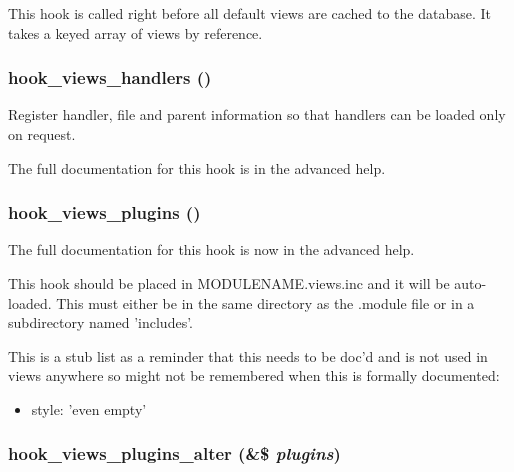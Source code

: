This hook is called right before all default views are cached to the database. It takes a keyed array of views by reference. \hypertarget{group__views__hooks_gbf506f44bd8d8a86876f27396f5341ed}{
\subsubsection[{hook\_\-views\_\-handlers}]{\setlength{\rightskip}{0pt plus 5cm}hook\_\-views\_\-handlers ()}}
\label{group__views__hooks_gbf506f44bd8d8a86876f27396f5341ed}


Register handler, file and parent information so that handlers can be loaded only on request.

The full documentation for this hook is in the advanced help. \hypertarget{group__views__hooks_g23f6e9972b2ed84fc54b7ff63f44477d}{
\subsubsection[{hook\_\-views\_\-plugins}]{\setlength{\rightskip}{0pt plus 5cm}hook\_\-views\_\-plugins ()}}
\label{group__views__hooks_g23f6e9972b2ed84fc54b7ff63f44477d}


The full documentation for this hook is now in the advanced help.

This hook should be placed in MODULENAME.views.inc and it will be auto-loaded. This must either be in the same directory as the .module file or in a subdirectory named 'includes'.

This is a stub list as a reminder that this needs to be doc'd and is not used in views anywhere so might not be remembered when this is formally documented:\begin{itemize}
\item style: 'even empty' \end{itemize}
\hypertarget{group__views__hooks_g6c4e4c2a769b0017bf0edcd0adae57e9}{
\subsubsection[{hook\_\-views\_\-plugins\_\-alter}]{\setlength{\rightskip}{0pt plus 5cm}hook\_\-views\_\-plugins\_\-alter (\&\$ {\em plugins})}}
\label{group__views__hooks_g6c4e4c2a769b0017bf0edcd0adae57e9}


